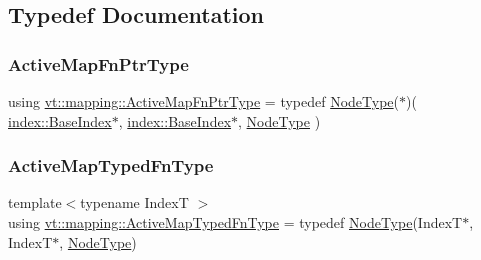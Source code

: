 \subsection{Typedef Documentation}
\mbox{\label{namespacevt_1_1mapping_a748d5efb71ca5878288d5809f57d7254}} 
\subsubsection{\texorpdfstring{Active\+Map\+Fn\+Ptr\+Type}{ActiveMapFnPtrType}}
{\footnotesize\ttfamily using \hyperlink{namespacevt_1_1mapping_a748d5efb71ca5878288d5809f57d7254}{vt\+::mapping\+::\+Active\+Map\+Fn\+Ptr\+Type} = typedef \hyperlink{namespacevt_a866da9d0efc19c0a1ce79e9e492f47e2}{Node\+Type}($\ast$)( \hyperlink{structvt_1_1index_1_1_base_index}{index\+::\+Base\+Index}$\ast$, \hyperlink{structvt_1_1index_1_1_base_index}{index\+::\+Base\+Index}$\ast$, \hyperlink{namespacevt_a866da9d0efc19c0a1ce79e9e492f47e2}{Node\+Type} )}

\mbox{\label{namespacevt_1_1mapping_ad7c0812428b339edd904a865e0080ecd}} 
\subsubsection{\texorpdfstring{Active\+Map\+Typed\+Fn\+Type}{ActiveMapTypedFnType}}
{\footnotesize\ttfamily template$<$typename IndexT $>$ \\
using \hyperlink{namespacevt_1_1mapping_ad7c0812428b339edd904a865e0080ecd}{vt\+::mapping\+::\+Active\+Map\+Typed\+Fn\+Type} = typedef \hyperlink{namespacevt_a866da9d0efc19c0a1ce79e9e492f47e2}{Node\+Type}(IndexT$\ast$, IndexT$\ast$, \hyperlink{namespacevt_a866da9d0efc19c0a1ce79e9e492f47e2}{Node\+Type})}

\mbox{\label{namespacevt_1_1mapping_a254b50d55be91c3bd002481b2e96da7e}} 

